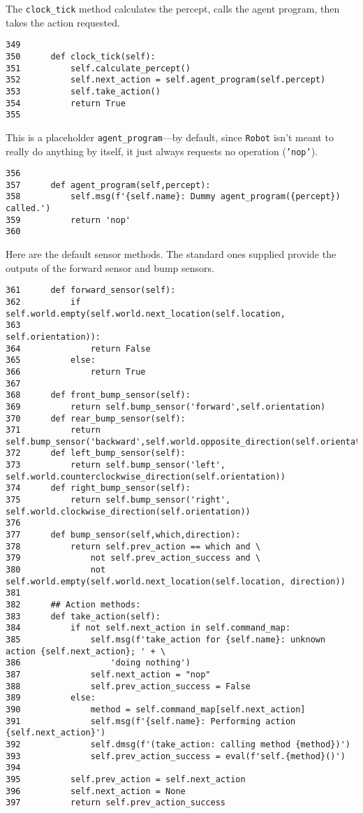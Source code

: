 \documentclass[11pt]{tufte-handout}
\begin{document}
The \texttt{clock\_tick} method calculates the percept, calls the agent program, then takes the action requested.

\begin{verbatim}
349  
350      def clock_tick(self):
351          self.calculate_percept()
352          self.next_action = self.agent_program(self.percept)
353          self.take_action()
354          return True
355  
\end{verbatim}

This is a placeholder \texttt{agent\_program}---by default, since \texttt{Robot} isn't meant to really do anything by itself, it just always requests no operation (\texttt{'nop'}).

\begin{verbatim}
356  
357      def agent_program(self,percept):
358          self.msg(f'{self.name}: Dummy agent_program({percept}) called.')
359          return 'nop'
360  
\end{verbatim}

Here are the default sensor methods.  The standard ones supplied provide the outputs of the forward sensor and bump sensors.

\begin{verbatim}
361      def forward_sensor(self):
362          if self.world.empty(self.world.next_location(self.location,
363                                                       self.orientation)):
364              return False
365          else:
366              return True
367  
368      def front_bump_sensor(self):
369          return self.bump_sensor('forward',self.orientation)
370      def rear_bump_sensor(self):
371          return self.bump_sensor('backward',self.world.opposite_direction(self.orientation))
372      def left_bump_sensor(self):
373          return self.bump_sensor('left', self.world.counterclockwise_direction(self.orientation))
374      def right_bump_sensor(self):
375          return self.bump_sensor('right', self.world.clockwise_direction(self.orientation))
376  
377      def bump_sensor(self,which,direction):
378          return self.prev_action == which and \
379              not self.prev_action_success and \
380              not self.world.empty(self.world.next_location(self.location, direction))
381  
382      ## Action methods:
383      def take_action(self):
384          if not self.next_action in self.command_map:
385              self.msg(f'take_action for {self.name}: unknown action {self.next_action}; ' + \
386                  'doing nothing')
387              self.next_action = "nop"
388              self.prev_action_success = False
389          else:
390              method = self.command_map[self.next_action]
391              self.msg(f'{self.name}: Performing action {self.next_action}')
392              self.dmsg(f'(take_action: calling method {method})')
393              self.prev_action_success = eval(f'self.{method}()')
394  
395          self.prev_action = self.next_action
396          self.next_action = None
397          return self.prev_action_success
\end{verbatim}
\end{document}

